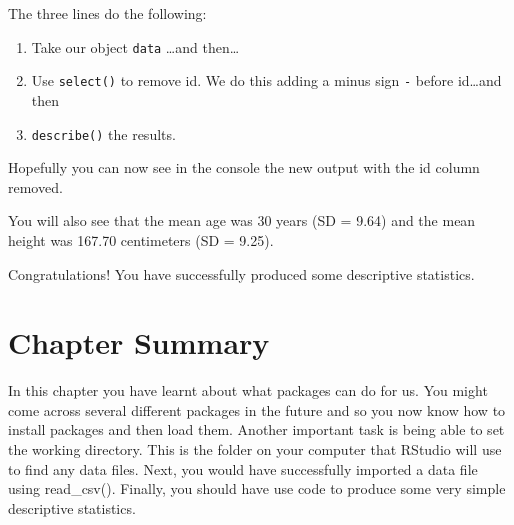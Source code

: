 \documentclass[
]{book}
\let\oldsection\section
\renewcommand{\section}{\needspace{5\baselineskip}\oldsection}
\begin{document}
The three lines do the following:

\begin{enumerate}
\def\labelenumi{\arabic{enumi}.}
\item
  Take our object \texttt{data} \ldots and then\ldots{}
\item
  Use \texttt{select()} to remove id. We do this adding a minus sign \texttt{-} before id\ldots and then
\item
  \texttt{describe()} the results.
\end{enumerate}

Hopefully you can now see in the console the new output with the id column removed.

You will also see that the mean age was 30 years (SD = 9.64) and the mean height was 167.70 centimeters (SD = 9.25).

Congratulations! You have successfully produced some descriptive statistics.

\section{Chapter Summary}\label{chapter-summary-2}

In this chapter you have learnt about what packages can do for us. You might come across several different packages in the future and so you now know how to install packages and then load them. Another important task is being able to set the working directory. This is the folder on your computer that RStudio will use to find any data files. Next, you would have successfully imported a data file using read\_csv(). Finally, you should have use code to produce some very simple descriptive statistics.

  
\end{document}
